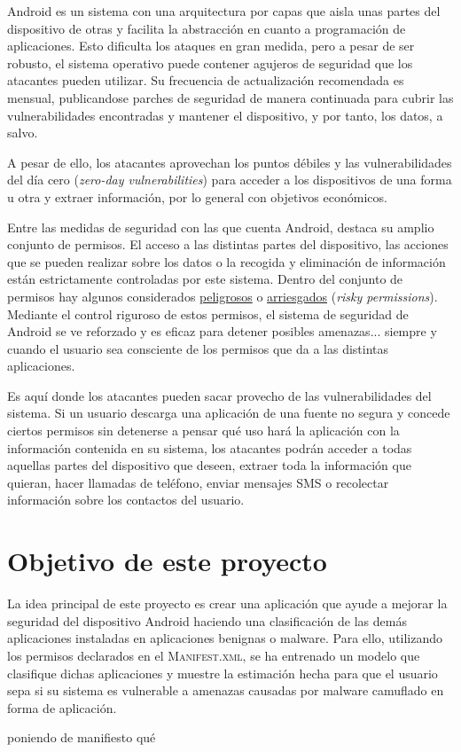 Android es un sistema con una arquitectura por capas que aisla unas partes del dispositivo de otras y facilita la abstracción en cuanto a programación de aplicaciones. Esto dificulta los ataques en gran medida, pero a pesar de ser robusto, el sistema operativo puede contener agujeros de seguridad que los atacantes pueden utilizar. Su frecuencia de actualización recomendada es mensual, publicandose parches de seguridad de manera continuada para cubrir las vulnerabilidades encontradas y mantener el dispositivo, y por tanto, los datos, a salvo.

A pesar de ello, los atacantes aprovechan los puntos débiles y las vulnerabilidades del día cero (\textit{zero-day vulnerabilities}) para acceder a los dispositivos de una forma u otra y extraer información, por lo general con objetivos económicos.

Entre las medidas de seguridad con las que cuenta Android, destaca su amplio conjunto de permisos. El acceso a las distintas partes del dispositivo, las acciones que se pueden realizar sobre los datos o la recogida y eliminación de información están estrictamente controladas por este sistema. Dentro del conjunto de permisos hay algunos considerados \underline{peligrosos} o \underline{arriesgados} (\textit{risky permissions}). Mediante el control riguroso de estos permisos, el sistema de seguridad de Android se ve reforzado y es eficaz para detener posibles amenazas... siempre y cuando el usuario sea consciente de los permisos que da a las distintas aplicaciones.

Es aquí donde los atacantes pueden sacar provecho de las vulnerabilidades del sistema. Si un usuario descarga una aplicación de una fuente no segura y concede ciertos permisos sin detenerse a pensar qué uso hará la aplicación con la información contenida en su sistema, los atacantes podrán acceder a todas aquellas partes del dispositivo que deseen, extraer toda la información que quieran, hacer llamadas de teléfono, enviar mensajes SMS o recolectar información sobre los contactos del usuario.

\section{Objetivo de este proyecto}

La idea principal de este proyecto es crear una aplicación que ayude a mejorar la seguridad del dispositivo Android haciendo una clasificación de las demás aplicaciones instaladas en aplicaciones benignas o malware. Para ello, utilizando los permisos declarados en el \textsc{Manifest.xml}, se ha entrenado un modelo que clasifique dichas aplicaciones y muestre la estimación hecha para que el usuario sepa si su sistema es vulnerable a amenazas causadas por malware camuflado en forma de aplicación.

poniendo de manifiesto qué 